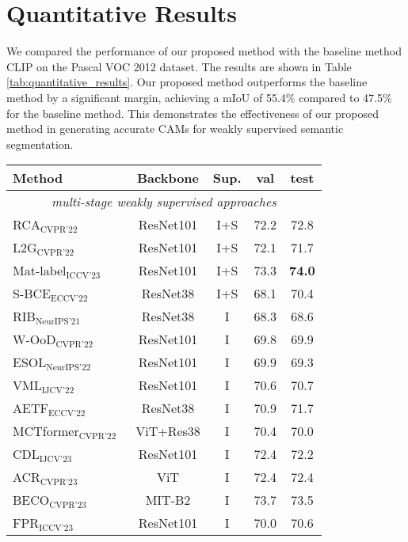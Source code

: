\section{Quantitative Results}
\label{subsec: Quantitative Results}
We compared the performance of our proposed method with the baseline method CLIP \cite{wsss_frozen_clip} on the Pascal VOC 2012 dataset. The results are shown in Table \ref{tab:quantitative_results}. Our proposed method outperforms the baseline method by a significant margin, achieving a mIoU of 55.4\% compared to 47.5\% for the baseline method. This demonstrates the effectiveness of our proposed method in generating accurate CAMs for weakly supervised semantic segmentation.


\begin{table}[ht]
\centering
\renewcommand{\arraystretch}{1.2}
\setlength{\tabcolsep}{6pt}
\begin{tabular}{l c c c c}
\hline
Method & Backbone & Sup. & val & test \\
\hline
\multicolumn{5}{c}{\textit{multi-stage weakly supervised approaches}} \\
RCA$_{\text{CVPR'22}}$~\cite{64} & ResNet101 & I+S & 72.2 & 72.8 \\
L2G$_{\text{CVPR'22}}$~\cite{19} & ResNet101 & I+S & 72.1 & 71.7 \\
Mat-label$_{\text{ICCV'23}}$~\cite{45} & ResNet101 & I+S & 73.3 & \textbf{74.0} \\
S-BCE$_{\text{ECCV'22}}$~\cite{49} & ResNet38 & I+S & 68.1 & 70.4 \\
RIB$_{\text{NeurIPS'21}}$~\cite{23} & ResNet38 & I & 68.3 & 68.6 \\
W-OoD$_{\text{CVPR'22}}$~\cite{24} & ResNet101 & I & 69.8 & 69.9 \\
ESOL$_{\text{NeurIPS'22}}$~\cite{25} & ResNet101 & I & 69.9 & 69.3 \\
VML$_{\text{IJCV'22}}$~\cite{38} & ResNet101 & I & 70.6 & 70.7 \\
AETF$_{\text{ECCV'22}}$~\cite{54} & ResNet38 & I & 70.9 & 71.7 \\
MCTformer$_{\text{CVPR'22}}$~\cite{52} & ViT+Res38 & I & 70.4 & 70.0 \\
CDL$_{\text{IJCV'23}}$~\cite{58} & ResNet101 & I & 72.4 & 72.2 \\
ACR$_{\text{CVPR'23}}$~\cite{22} & ViT & I & 72.4 & 72.4 \\
BECO$_{\text{CVPR'23}}$~\cite{37} & MIT-B2 & I & 73.7 & 73.5 \\
FPR$_{\text{ICCV'23}}$~\cite{5} & ResNet101 & I & 70.0 & 70.6 \\

\end{tabular}
\end{table}

